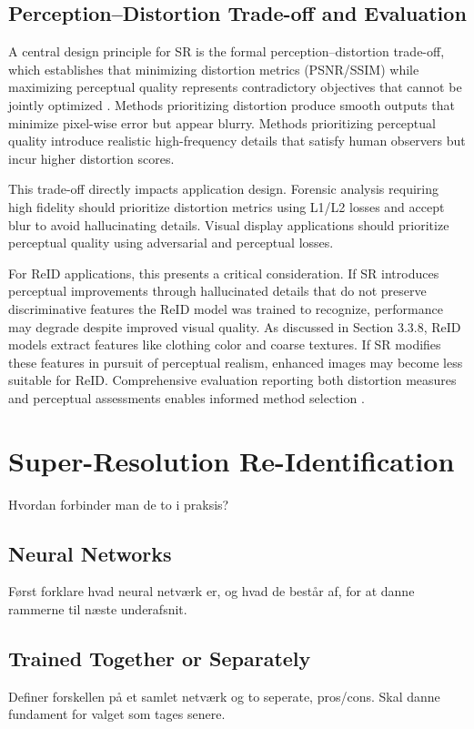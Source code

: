 \subsection{Perception–Distortion Trade-off and Evaluation}

A central design principle for SR is the formal perception–distortion trade-off, which establishes that minimizing distortion metrics (PSNR/SSIM) while maximizing perceptual quality represents contradictory objectives that cannot be jointly optimized \cite{Blau2018PerceptionDistortion}. Methods prioritizing distortion produce smooth outputs that minimize pixel-wise error but appear blurry. Methods prioritizing perceptual quality introduce realistic high-frequency details that satisfy human observers but incur higher distortion scores.

This trade-off directly impacts application design. Forensic analysis requiring high fidelity should prioritize distortion metrics using L1/L2 losses and accept blur to avoid hallucinating details. Visual display applications should prioritize perceptual quality using adversarial and perceptual losses.

For ReID applications, this presents a critical consideration. If SR introduces perceptual improvements through hallucinated details that do not preserve discriminative features the ReID model was trained to recognize, performance may degrade despite improved visual quality. As discussed in Section 3.3.8, ReID models extract features like clothing color and coarse textures. If SR modifies these features in pursuit of perceptual realism, enhanced images may become less suitable for ReID. Comprehensive evaluation reporting both distortion measures and perceptual assessments enables informed method selection \cite{Zhang2018LPIPS,Mittal2013NIQE,Wang2004SSIM}.


\section{Super-Resolution Re-Identification}
Hvordan forbinder man de to i praksis?

\subsection{Neural Networks}
Først forklare hvad neural netværk er, og hvad de består af, for at danne rammerne til næste underafsnit.

\subsection{Trained Together or Separately}
Definer forskellen på et samlet netværk og to seperate, pros/cons. Skal danne fundament for valget som tages senere. 

